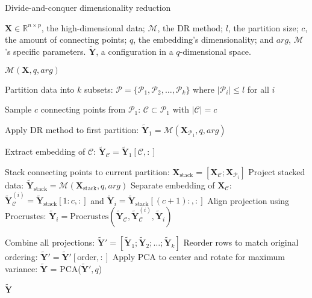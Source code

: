\begin{algorithm}
    \caption{Divide-and-conquer dimensionality reduction}
    \label{alg:DivideConquer}
    
    \begin{algorithmic}[1]
    \REQUIRE $\mathbf{X} \in \mathbb{R}^{n \times p}$, the high-dimensional data; $\mathcal{M}$, the DR method; $l$, the partition size; $c$, the amount of connecting points; $q$, the embedding's dimensionality; and $arg$, $\mathcal{M}$'s specific parameters.
    \ENSURE $\mathbf{\tilde{Y}}$, a configuration in a $q$-dimensional space.
    
        \RETURN $\mathcal{M}(\mathbf{X}, q, arg)$
    \ENDIF
    
    \STATE Partition data into $k$ subsets: $\mathcal{P} = \{\mathcal{P}_1, \mathcal{P}_2, \ldots, \mathcal{P}_k\}$ where $|\mathcal{P}_i| \leq l$ for all $i$
    
    \STATE Sample $c$ connecting points from $\mathcal{P}_1$: $\mathcal{C} \subset \mathcal{P}_1$ with $|\mathcal{C}| = c$
    
    \STATE Apply DR method to first partition: $\mathbf{\tilde{Y}}_1 = \mathcal{M}(\mathbf{X}_{\mathcal{P}_1}, q, arg)$

    \STATE Extract embedding of $\mathcal{C}$: $\mathbf{\tilde{Y}}_\mathcal{C} = \mathbf{\tilde{Y}}_1[{\mathcal{C}},:]$
    
        \STATE Stack connecting points to current partition: $\mathbf{X}_{\text{stack}} = [\mathbf{X}_{\mathcal{C}}; \mathbf{X}_{\mathcal{P}_i}]$
        \STATE Project stacked data: $\mathbf{\tilde{Y}}_{\text{stack}} = \mathcal{M}(\mathbf{X}_{\text{stack}}, q, arg)$
        \STATE Separate embedding of $\mathbf{X}_{\mathcal{C}}$: $\mathbf{\tilde{Y}}_{\mathcal{C}}^{(i)} = \mathbf{\tilde{Y}}_{\text{stack}}[1:c,:]$ and $\mathbf{\tilde{Y}}_i = \mathbf{\tilde{Y}}_{\text{stack}}[(c+1):,:]$
        \STATE Align projection using Procrustes: $\mathbf{\tilde{Y}}_i = \text{Procrustes}(\mathbf{\tilde{Y}}_\mathcal{C}, \mathbf{\tilde{Y}}_{\mathcal{C}}^{(i)}, \mathbf{\tilde{Y}}_i)$
    \ENDFOR
    
    \STATE Combine all projections: $\mathbf{\tilde{Y}}' = [\mathbf{\tilde{Y}}_1; \mathbf{\tilde{Y}}_2; \ldots; \mathbf{\tilde{Y}}_k]$
    \STATE Reorder rows to match original ordering: $\mathbf{\tilde{Y}}' = \mathbf{\tilde{Y}}'[\text{order},:]$
    \STATE Apply PCA to center and rotate for maximum variance: $\mathbf{\tilde{Y}}$ = PCA($\mathbf{\tilde{Y}}', q$)
    
    \RETURN $\mathbf{\tilde{Y}}$
    \end{algorithmic}
\end{algorithm}

